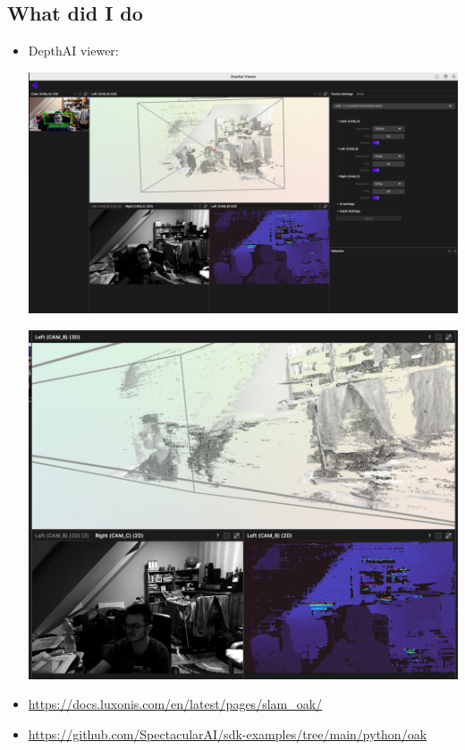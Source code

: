 \documentclass{article}
\begin{document}
\subsection{What did I do}
\begin{itemize}
    \item DepthAI viewer:\par
    \begin{minipage}{\linewidth}
        \centering
        \includegraphics[width=1\linewidth]{depthai_viewer.png}
    \end{minipage}
    \begin{minipage}{\linewidth}
        \centering
        \includegraphics[width=1\linewidth]{depthai_viewer_3d.png}
    \end{minipage}
    \item \url{https://docs.luxonis.com/en/latest/pages/slam_oak/}
    \item \url{https://github.com/SpectacularAI/sdk-examples/tree/main/python/oak}
        
\end{itemize}
\end{document}
